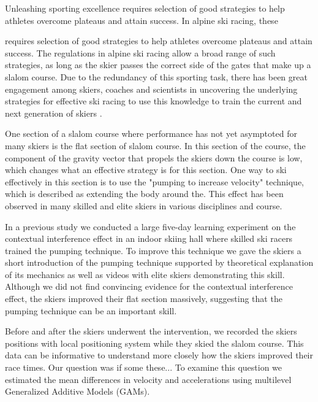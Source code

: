 \documentclass{article}
\begin{document}
Unleashing sporting excellence requires selection of good strategies to help athletes overcome plateaus and attain success. In alpine ski racing, these 


requires selection of good strategies to help athletes overcome plateaus and attain success. The regulations in alpine ski racing allow a broad range of such strategies, as long as the skier passes the correct side of the gates that make up a slalom course. Due to the redundancy of this sporting task, there has been great engagement among skiers, coaches and scientists in uncovering the underlying strategies for effective ski racing to use this knowledge to train the current and next generation of skiers \cite{joubertHowSkiNew1967, joubertSkiArtTechnique1978, mullerAnalysisBiomechanicalCharacteristics1994, lemasterSkierEdge1999, lemasterUltimateSkiing2010}.

One section of a slalom course where performance has not yet asymptoted for many skiers is the flat section of slalom course. In this section of the course, the component of the gravity vector that propels the skiers down the course is low, which changes what an effective strategy is for this section. One way to ski effectively in this section is to use the "pumping to increase velocity" technique, which is described as extending the body around the. This effect has been observed in many skilled and elite skiers in various disciplines and course.

In a previous study we conducted a large five-day learning experiment on the contextual interference effect in an indoor skiing hall where skilled ski racers trained the pumping technique. To improve this technique we gave the skiers a short introduction of the pumping technique supported by theoretical explanation of its mechanics as well as videos with elite skiers demonstrating this skill. Although we did not find convincing evidence for the contextual interference effect, the skiers improved their flat section massively, suggesting that the pumping technique can be an important skill.

Before and after the skiers underwent the intervention, we recorded the skiers positions with local positioning system while they skied the slalom course. This data can be informative to understand more closely how the skiers improved their race times. Our question was if some these... To examine this question we estimated the mean differences in velocity and accelerations using multilevel Generalized Additive Models (GAMs).
\end{document}
